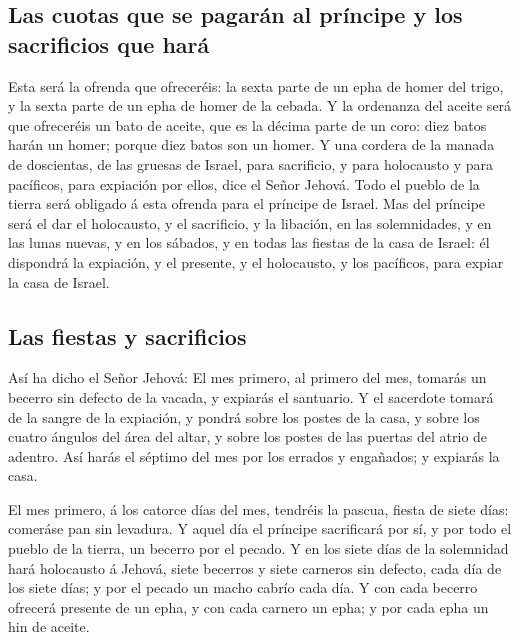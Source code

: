 \hypertarget{las-cuotas-que-se-pagaruxe1n-al-pruxedncipe-y-los-sacrificios-que-haruxe1}{%
\subsection{Las cuotas que se pagarán al príncipe y los sacrificios que
hará}\label{las-cuotas-que-se-pagaruxe1n-al-pruxedncipe-y-los-sacrificios-que-haruxe1}}

 Esta será la ofrenda que ofreceréis: la sexta parte de
un epha de homer del trigo, y la sexta parte de un epha de homer de la
cebada.  Y la ordenanza del aceite será que ofreceréis un
bato de aceite, que es la décima parte de un coro: diez batos harán un
homer; porque diez batos son un homer.  Y una cordera de
la manada de doscientas, de las gruesas de Israel, para sacrificio, y
para holocausto y para pacíficos, para expiación por ellos, dice el
Señor Jehová.  Todo el pueblo de la tierra será obligado
á esta ofrenda para el príncipe de Israel.  Mas del
príncipe será el dar el holocausto, y el sacrificio, y la libación, en
las solemnidades, y en las lunas nuevas, y en los sábados, y en todas
las fiestas de la casa de Israel: él dispondrá la expiación, y el
presente, y el holocausto, y los pacíficos, para expiar la casa de
Israel.

\hypertarget{las-fiestas-y-sacrificios}{%
\subsection{Las fiestas y sacrificios}\label{las-fiestas-y-sacrificios}}

 Así ha dicho el Señor Jehová: El mes primero, al primero
del mes, tomarás un becerro sin defecto de la vacada, y expiarás el
santuario.  Y el sacerdote tomará de la sangre de la
expiación, y pondrá sobre los postes de la casa, y sobre los cuatro
ángulos del área del altar, y sobre los postes de las puertas del atrio
de adentro.  Así harás el séptimo del mes por los errados
y engañados; y expiarás la casa.

 El mes primero, á los catorce días del mes, tendréis la
pascua, fiesta de siete días: comeráse pan sin levadura. 
Y aquel día el príncipe sacrificará por sí, y por todo el pueblo de la
tierra, un becerro por el pecado.  Y en los siete días de
la solemnidad hará holocausto á Jehová, siete becerros y siete carneros
sin defecto, cada día de los siete días; y por el pecado un macho cabrío
cada día.  Y con cada becerro ofrecerá presente de un
epha, y con cada carnero un epha; y por cada epha un hin de aceite.

